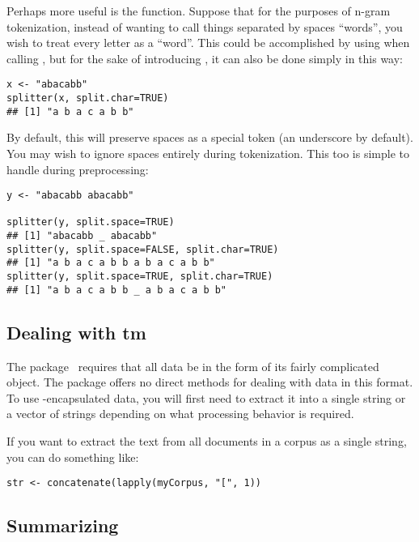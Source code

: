 Perhaps more useful is the  function.  Suppose that for the
purposes of n-gram tokenization, instead of wanting to call things separated by
spaces ``words'', you wish to treat every letter as a ``word''. This could be
accomplished by using  when calling , but for the
sake of introducing , it can also be done simply in this
way:

\begin{lstlisting}[language=rr]
x <- "abacabb"
splitter(x, split.char=TRUE)
## [1] "a b a c a b b"
\end{lstlisting}

By default, this will preserve spaces as a special token (an underscore by
default).  You may wish to ignore spaces entirely during tokenization.  This too
is simple to handle during preprocessing:

\begin{lstlisting}[language=rr]
y <- "abacabb abacabb"
 
splitter(y, split.space=TRUE)
## [1] "abacabb _ abacabb"
splitter(y, split.space=FALSE, split.char=TRUE)
## [1] "a b a c a b b a b a c a b b"
splitter(y, split.space=TRUE, split.char=TRUE)
## [1] "a b a c a b b _ a b a c a b b"
\end{lstlisting}



\subsection{Dealing with tm}

The  package~\citep{tm} requires that all data be in the form of its
fairly complicated  object.  The  package offers no
direct methods for dealing with data in this format.  To use
-encapsulated data, you will first need to extract it into a single
string or a vector of strings depending on what processing behavior is required.

If you want to extract the text from all documents in a corpus as a single
string, you can do something like:

\begin{lstlisting}[language=rr]
str <- concatenate(lapply(myCorpus, "[", 1))   
\end{lstlisting}




\subsection{Summarizing}

